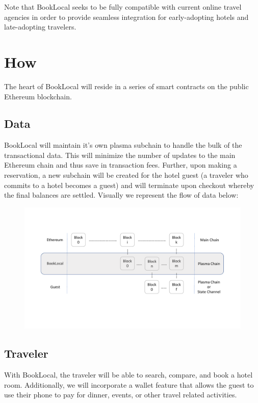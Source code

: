 \documentclass{article}
\begin{document}
\begin{flushleft}
Note that BookLocal seeks to be fully compatible with current online travel agencies in order to provide seamless integration for early-adopting hotels and late-adopting travelers.
\end{flushleft}

\newpage
\section{How}
The heart of BookLocal will reside in a series of smart contracts on the public Ethereum blockchain. 
\subsection{Data}
BookLocal will maintain it's own plasma subchain to handle the bulk of the transactional data. This will minimize the number of updates to the main Ethereum chain and thus save in transaction fees. Further, upon making a reservation, a new subchain will be created for the hotel guest (a traveler who commits to a hotel becomes a guest) and will terminate upon checkout whereby the final balances are settled. Visually we represent the flow of data below:

\begin{figure}[H]
\centering
\includegraphics[width = \textwidth]{bookLocal_dataLayers.pdf}
\end{figure}

\subsection{Traveler}
With BookLocal, the traveler will be able to search, compare, and book a hotel room. Additionally, we will incorporate a wallet feature that allows the guest to use their phone to pay for dinner, events, or other travel related activities.  
\end{document}
